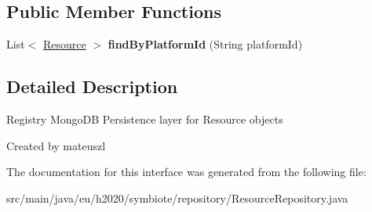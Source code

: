 \subsection*{Public Member Functions}
\begin{DoxyCompactItemize}
\item 
List$<$ \hyperlink{classeu_1_1h2020_1_1symbiote_1_1model_1_1Resource}{Resource} $>$ {\bfseries find\+By\+Platform\+Id} (String platform\+Id)\hypertarget{interfaceeu_1_1h2020_1_1symbiote_1_1repository_1_1ResourceRepository_aec7bce58cf66e21ad20c28041306c089}{}\label{interfaceeu_1_1h2020_1_1symbiote_1_1repository_1_1ResourceRepository_aec7bce58cf66e21ad20c28041306c089}

\end{DoxyCompactItemize}


\subsection{Detailed Description}
Registry Mongo\+DB Persistence layer for Resource objects

Created by mateuszl 

The documentation for this interface was generated from the following file\+:\begin{DoxyCompactItemize}
\item 
src/main/java/eu/h2020/symbiote/repository/Resource\+Repository.\+java\end{DoxyCompactItemize}
